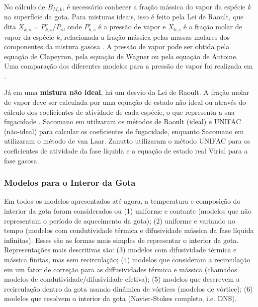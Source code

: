 No cálculo de $B_{M,k}$, é necessário conhecer a fração mássica do vapor da espécie $k$ na superfície da gota.
Para misturas ideais, isso é feito pela Lei de Raoult, que dita $X_{k,s}=P^v_{k,s}/P_s$, onde $P^v_{k,s}$ é a pressão de vapor e $X_{k,s}$ é a fração molar de vapor da espécie $k$, relacionada a fração mássica pelas massas molares dos componentes da mistura gasosa \cite{Peters2010}.
A pressão de vapor pode ser obtida pela equação de Clapeyron, pela equação de Wagner ou pela equação de Antoine.
Uma comparação dos diferentes modelos para a pressão de vapor foi realizada em \cite{SacomanoF2019IJHMT}.

Já em uma \textbf{mistura não ideal}, há um desvio da Lei de Raoult. 
A fração molar de vapor deve ser calculada por uma equação de estado não ideal ou através do cálculo dos coeficientes de atividade de cada espécie, o que representa a sua fugacidade \cite{Bird2002}.
Sacomano\etal{} em \cite{SacomanoF2022IJHMT} utilzaram os métodos de Raoult (ideal) e UNIFAC (não-ideal) para calcular os coeficientes de fugacidade, enquanto Sacomano\etal{} em \cite{SacomanoF2025CF} utilizaram o método de van Laar.
Zanutto\etal{} \cite{ZanuttoC2019} utilizaram o método UNIFAC para os coeficientes de atividade da fase líquida e a equação de estado real Virial para a fase gasosa.


\subsubsection{Modelos para o Interor da Gota} \label{sec:int}

Em todos os modelos apresentados até agora, a temperatura e composição do interior da gota foram considerados ou (1) uniforme e contante (modelos que não representam o período de aquecimento da gota); (2) uniforme e variando no tempo (modelos com condutividade térmica e difusividade mássica da fase líquida infinitas).
Esses são as formas mais simples de representar o interior da gota.
Representações mais descritivas são: (3) modelos com difusividade térmica e mássica finitas, mas sem recirculação; (4) modelos que consideram a recirculação em um fator de correção para as diffusividades térmica e mássica (chamados modelos de condutividade/difusividade efetiva); (5) modelos que descrevem a recirculação dentro da gota usando dinâmica de vórtices (modelos de vórtice); (6) modelos que resolvem o interior da gota (Navier-Stokes completo, i.e. DNS). \cite{Sazhin2006}

